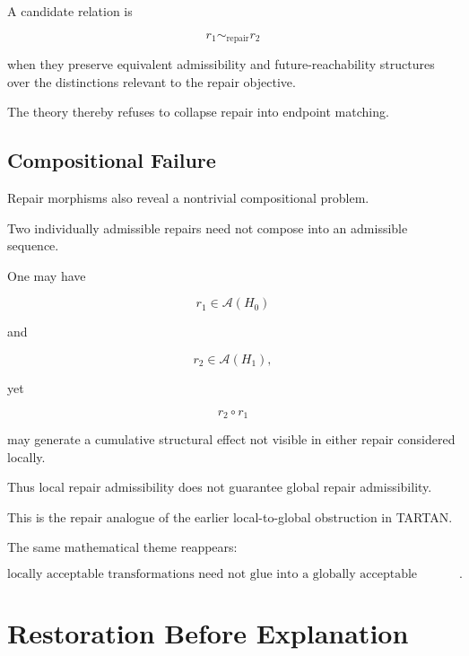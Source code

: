 \documentclass[11pt]{article}
\theoremstyle{remark}
\newcommand{\Adm}{\mathcal{A}}
\begin{document}
A candidate relation is

\begin{equation}
r_1\sim_{\mathrm{repair}}r_2
\end{equation}

when they preserve equivalent admissibility and future-reachability structures over the distinctions relevant to the repair objective.

The theory thereby refuses to collapse repair into endpoint matching.

\subsection{Compositional Failure}

Repair morphisms also reveal a nontrivial compositional problem.

Two individually admissible repairs need not compose into an admissible sequence.

One may have

\begin{equation}
r_1\in\Adm(H_0)
\end{equation}

and

\begin{equation}
r_2\in\Adm(H_1),
\end{equation}

yet

\begin{equation}
r_2\circ r_1
\end{equation}

may generate a cumulative structural effect not visible in either repair considered locally.

Thus local repair admissibility does not guarantee global repair admissibility.

This is the repair analogue of the earlier local-to-global obstruction in TARTAN.

The same mathematical theme reappears:

\begin{equation}
\boxed{
\text{locally acceptable transformations need not glue into a globally acceptable history}.
}
\end{equation}

\section{Restoration Before Explanation}
\end{document}
